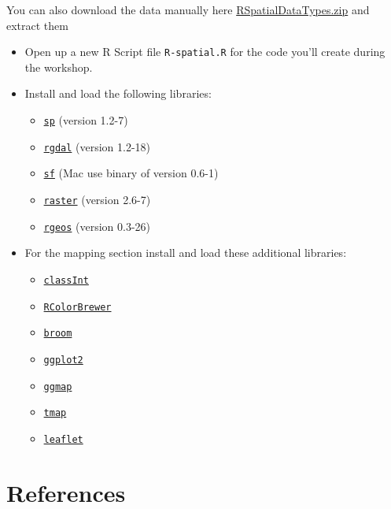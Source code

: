 \documentclass[]{book}
\providecommand{\tightlist}{%
  \setlength{\itemsep}{0pt}\setlength{\parskip}{0pt}}
\theoremstyle{definition}
\theoremstyle{definition}
\theoremstyle{definition}
\theoremstyle{remark}
\begin{document}
You can also download the data manually here
\href{\%22https://www.dropbox.com/s/g5p8b1xi2k5lydw/RSpatialDataTypes.zip?dl=1\%22,}{RSpatialDataTypes.zip}
and extract them

\begin{itemize}
\item
  Open up a new R Script file \texttt{R-spatial.R} for the code you'll
  create during the workshop.
\item
  Install and load the following libraries:

  \begin{itemize}
  \tightlist
  \item
    \href{https://CRAN.R-project.org/package=sp}{\texttt{sp}} (version
    1.2-7)
  \item
    \href{https://CRAN.R-project.org/package=rgdal}{\texttt{rgdal}}
    (version 1.2-18)
  \item
    \href{https://cran.r-project.org/package=sf}{\texttt{sf}} (Mac use
    binary of version 0.6-1)
  \item
    \href{https://CRAN.R-project.org/package=raster}{\texttt{raster}}
    (version 2.6-7)
  \item
    \href{https://CRAN.R-project.org/package=rgeos}{\texttt{rgeos}}
    (version 0.3-26)
  \end{itemize}
\item
  For the mapping section install and load these additional libraries:

  \begin{itemize}
  \tightlist
  \item
    \href{https://cran.r-project.org/package=classInt}{\texttt{classInt}}
  \item
    \href{https://cran.r-project.org/package=RColorBrewer}{\texttt{RColorBrewer}}
  \item
    \href{https://cran.r-project.org/package=broom}{\texttt{broom}}
  \item
    \href{https://cran.r-project.org/package=ggplot2}{\texttt{ggplot2}}
  \item
    \href{https://cran.r-project.org/package=ggmap}{\texttt{ggmap}}
  \item
    \href{https://cran.r-project.org/package=tmap}{\texttt{tmap}}
  \item
    \href{https://cran.r-project.org/package=leaflet}{\texttt{leaflet}}
  \end{itemize}
\end{itemize}

\section*{References}\label{references}
\end{document}
